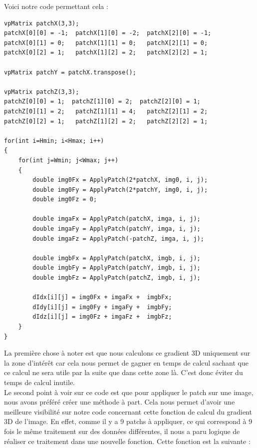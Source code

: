 \documentclass[a4paper,11pt]{article}
\begin{document}
Voici notre code permettant cela :
\begin{verbatim}
vpMatrix patchX(3,3);
patchX[0][0] = -1;  patchX[1][0] = -2;  patchX[2][0] = -1;
patchX[0][1] = 0;   patchX[1][1] = 0;   patchX[2][1] = 0;
patchX[0][2] = 1;   patchX[1][2] = 2;   patchX[2][2] = 1;

vpMatrix patchY = patchX.transpose();

vpMatrix patchZ(3,3);
patchZ[0][0] = 1;  patchZ[1][0] = 2;  patchZ[2][0] = 1;
patchZ[0][1] = 2;   patchZ[1][1] = 4;   patchZ[2][1] = 2;
patchZ[0][2] = 1;   patchZ[1][2] = 2;   patchZ[2][2] = 1;

for(int i=Hmin; i<Hmax; i++) 
{
    for(int j=Wmin; j<Wmax; j++) 
    {
        double img0Fx = ApplyPatch(2*patchX, img0, i, j);
        double img0Fy = ApplyPatch(2*patchY, img0, i, j);
        double img0Fz = 0;

        double imgaFx = ApplyPatch(patchX, imga, i, j);
        double imgaFy = ApplyPatch(patchY, imga, i, j);
        double imgaFz = ApplyPatch(-patchZ, imga, i, j);
	
        double imgbFx = ApplyPatch(patchX, imgb, i, j);
        double imgbFy = ApplyPatch(patchY, imgb, i, j);
        double imgbFz = ApplyPatch(patchZ, imgb, i, j);

        dIdx[i][j] = img0Fx + imgaFx +  imgbFx;
        dIdy[i][j] = img0Fy + imgaFy +  imgbFy;
        dIdz[i][j] = img0Fz + imgaFz +  imgbFz;
    }
}
\end{verbatim}

La premi\`ere chose \`a noter est que nous calculons ce gradient 3D uniquement sur la zone d'int\'er\^et car cela nous permet de gagner en temps de calcul sachant que ce calcul ne sera utile par la suite que dans cette zone l\`a. C'est donc \'eviter du temps de calcul inutile. \\
Le second point \`a voir sur ce code est que pour appliquer le patch sur une image, nous avons pr\'ef\'er\'e cr\'eer une m\'ethode \`a part. Cela nous permet d'avoir une meilleure visibilit\'e sur notre code concernant cette fonction de calcul du gradient 3D de l'image. En effet, comme il y a 9 patchs \`a appliquer, ce qui correspond \`a 9 fois le m\^eme traitement sur des donn\'ees diff\'erentes, il nous a paru logique de r\'ealiser ce traitement dans une nouvelle fonction. Cette fonction est la suivante :
\end{document}
